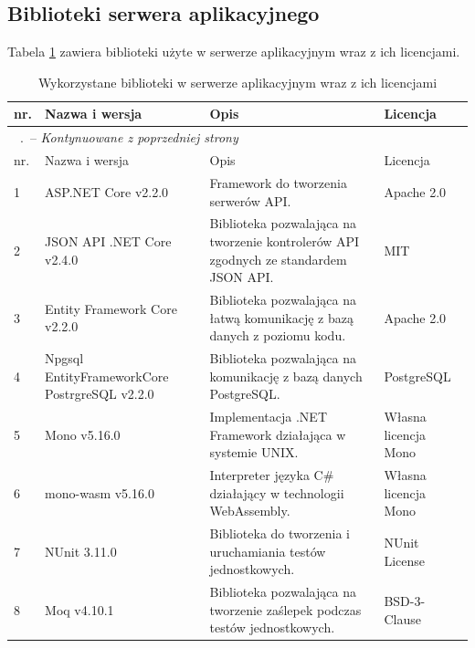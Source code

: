\documentclass[a4paper,11pt,twoside]{report}
\renewcommand*{\thetable}{\arabic{chapter}.\arabic{table}}
\theoremstyle{definition}
\begin{document}
        \subsection{Biblioteki serwera aplikacyjnego}
        Tabela \ref{biblioteki-serwer} zawiera biblioteki użyte w serwerze aplikacyjnym wraz z ich licencjami.
        
    \begin{longtable}{| p{} | p{} | p{} | p{} |}
        \caption{Wykorzystane biblioteki w serwerze aplikacyjnym wraz z ich licencjami}
        \label{biblioteki-serwer} \\
        \hline
        nr. & Nazwa i wersja & Opis & Licencja \\ \hline
        \endfirsthead
        \multicolumn{4}{l}{\footnotesize \tablename\ \thetable\ -- \textit{Kontynuowane z poprzedniej strony}} \\
        \hline
        nr. & Nazwa i wersja & Opis & Licencja \\ \hline
        \endhead
        
        1 & ASP.NET Core v2.2.0 & Framework do tworzenia serwerów API. & Apache 2.0 \\ \hline
        2 & JSON API .NET Core v2.4.0 & Biblioteka pozwalająca na tworzenie kontrolerów API zgodnych ze standardem JSON API. & MIT \\ \hline
        3 & Entity Framework Core v2.2.0 & Biblioteka pozwalająca na łatwą komunikację z bazą danych z poziomu kodu. & Apache 2.0 \\ \hline
        4 & Npgsql EntityFrameworkCore PostrgreSQL v2.2.0 & Biblioteka pozwalająca na komunikację z bazą danych PostgreSQL. & PostgreSQL \cite{licencja-postgresql} \\ \hline
        5 & Mono v5.16.0 & Implementacja .NET Framework działająca w systemie UNIX. & Własna licencja Mono \cite{licencja-mono} \\ \hline
        6 & mono-wasm v5.16.0 & Interpreter języka C\# działający w technologii WebAssembly. & Własna licencja Mono \cite{licencja-mono} \\ \hline
        7 & NUnit 3.11.0 & Biblioteka do tworzenia i uruchamiania testów jednostkowych. & NUnit License \cite{licencja-nunit} \\ \hline
        8 & Moq v4.10.1 & Biblioteka pozwalająca na tworzenie zaślepek podczas testów jednostkowych. & BSD-3-Clause \\ \hline
    \end{longtable}
        
\end{document}
